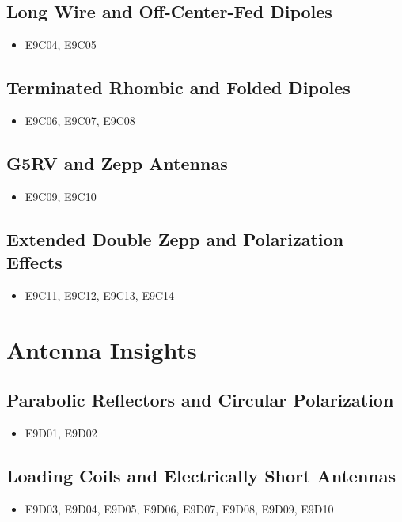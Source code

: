 \documentclass{book}
\begin{document}
\subsection{Long Wire and Off-Center-Fed Dipoles}
\begin{itemize}
    \item E9C04, E9C05
\end{itemize}
\subsection{Terminated Rhombic and Folded Dipoles}
\begin{itemize}
    \item E9C06, E9C07, E9C08
\end{itemize}
\subsection{G5RV and Zepp Antennas}
\begin{itemize}
    \item E9C09, E9C10
\end{itemize}
\subsection{Extended Double Zepp and Polarization Effects}
\begin{itemize}
    \item E9C11, E9C12, E9C13, E9C14
\end{itemize}

\section{Antenna Insights}
\subsection{Parabolic Reflectors and Circular Polarization}
\begin{itemize}
    \item E9D01, E9D02
\end{itemize}
\subsection{Loading Coils and Electrically Short Antennas}
\begin{itemize}
    \item E9D03, E9D04, E9D05, E9D06, E9D07, E9D08, E9D09, E9D10
\end{itemize}
\end{document}
